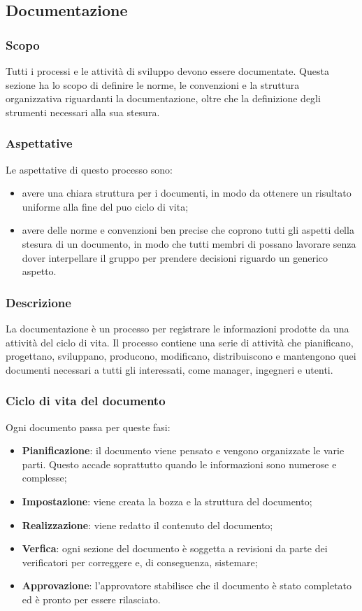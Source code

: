 \subsection{Documentazione}
\subsubsection{Scopo}
Tutti i processi e le attività di sviluppo devono essere documentate. Questa sezione ha lo scopo di definire le norme, le convenzioni e la struttura organizzativa riguardanti la documentazione, oltre che la definizione degli strumenti necessari alla sua stesura.
\subsubsection{Aspettative}
Le aspettative di questo processo sono:
\begin{itemize}
	\item avere una chiara struttura per i documenti, in modo da ottenere un risultato uniforme alla fine del puo ciclo di vita;	
	\item avere delle norme e convenzioni ben precise che coprono tutti gli aspetti della stesura di un documento, in modo che tutti membri di \Gruppo{} possano lavorare senza dover interpellare il gruppo per prendere decisioni riguardo un generico aspetto.
\end{itemize}
\subsubsection{Descrizione}
La documentazione è un processo per registrare le informazioni prodotte da una attività del ciclo di vita. Il processo contiene una serie di attività che pianificano, progettano, sviluppano, producono, modificano, distribuiscono e mantengono quei documenti necessari a tutti gli interessati, come manager, ingegneri e utenti.
\subsubsection{Ciclo di vita del documento}
Ogni documento passa per queste fasi:
\begin{itemize}

	\item \textbf{Pianificazione}: il documento viene pensato e vengono organizzate le varie parti. Questo accade soprattutto quando le informazioni sono numerose e complesse;
	
	\item \textbf{Impostazione}: viene creata la bozza e la struttura del documento;
	
	\item \textbf{Realizzazione}: viene redatto il contenuto del documento;
	
	\item \textbf{Verfica}: ogni sezione del documento è soggetta a revisioni da parte dei verificatori per correggere e, di conseguenza, sistemare;
	
	\item \textbf{Approvazione}: l'approvatore stabilisce che il documento è stato completato ed è pronto per essere rilasciato.
	
\end{itemize}
